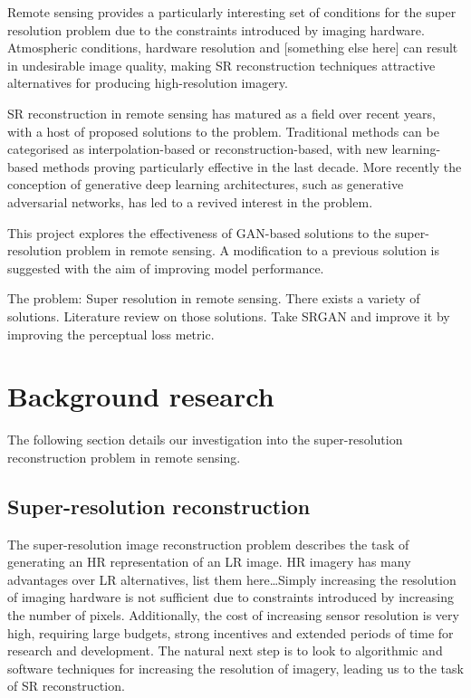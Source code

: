 Remote sensing provides a particularly interesting set of conditions for the super resolution problem due to the constraints introduced by imaging hardware. Atmospheric conditions, hardware resolution and [something else here] can result in undesirable image quality, making SR reconstruction techniques attractive alternatives for producing high-resolution imagery.

SR reconstruction in remote sensing has matured as a field over recent years, with a host of proposed solutions to the problem. Traditional methods can be categorised as interpolation-based or reconstruction-based, with new learning-based methods proving particularly effective in the last decade. More recently the conception of generative deep learning architectures, such as generative adversarial networks, has led to a revived interest in the problem.

This project explores the effectiveness of GAN-based solutions to the super-resolution problem in remote sensing. A modification to a previous solution is suggested with the aim of improving model performance.

The problem: Super resolution in remote sensing. There exists a variety of solutions. Literature review on those solutions. Take SRGAN and improve it by improving the perceptual loss metric.

\section{Background research}\label{sec:background_research}
The following section details our investigation into the super-resolution reconstruction problem in remote sensing.

\subsection{Super-resolution reconstruction}
The super-resolution image reconstruction problem describes the task of generating an HR representation of an LR image. HR imagery has many advantages over LR alternatives, list them here\dots Simply increasing the resolution of imaging hardware is not sufficient due to constraints introduced by increasing the number of pixels. Additionally, the cost of increasing sensor resolution is very high, requiring large budgets, strong incentives and extended periods of time for research and development. The natural next step is to look to algorithmic and software techniques for increasing the resolution of imagery, leading us to the task of SR reconstruction.

